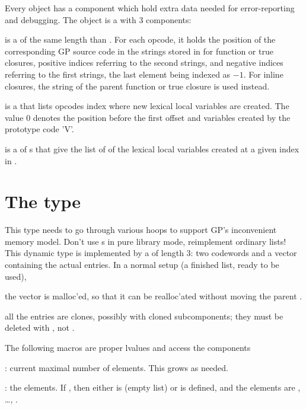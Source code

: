 \label{se:dbgclosure}

Every  object  has a component 
which hold extra data needed for error-reporting and debugging.
The object  is a  with $3$ components:

 is a  of the same length than . For each
opcode, it holds the position of the corresponding GP source code in the
strings stored in  for function or true closures, positive indices
referring to the second strings, and negative indices referring to the first
strings, the last element being indexed as $-1$. For inline closures, the
string of the parent function or true closure is used instead.

 is a  that lists opcodes index where new lexical
local variables are created. The value $0$ denotes the position before the
first offset and variables created by the prototype code 'V'.

 is a  of s that give the list of
 of the lexical local variables created at a given index in
.

\section{The type } This type needs to go
through various hoops to support GP's inconvenient memory model. Don't
use s in pure library mode, reimplement ordinary lists! This
dynamic type is implemented by a  of length 3: two codewords and a
vector containing the actual entries. In a normal setup (a finished list,
ready to be used),

\item the vector is malloc'ed, so that it can be realloc'ated without moving
the parent .

\item all the entries are clones, possibly with cloned subcomponents; they
must be deleted with , not .

The following macros are proper lvalues and access the components

: current maximal number of elements. This grows
as needed.

: the elements. If , then
either  is  (empty list) or  is defined, and
the elements are , \dots, .

